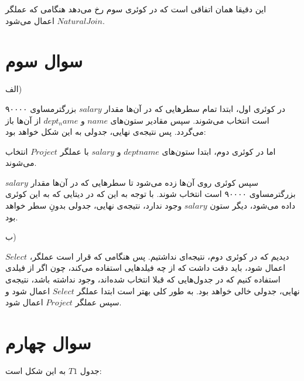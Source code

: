 این دقیقا همان اتفاقی است که در کوئری سوم رخ می‌دهد هنگامی که عملگر
$Natural Join$
اعمال می‌شود.



\section*{\centering سوال سوم}

الف)

در کوئری اول، ابتدا تمام سطرهایی که در آن‌ها مقدار 
$salary$
بزرگترمساوی ۹۰۰۰۰ است انتخاب می‌شوند. سپس مقادیر ستون‌های
$name$
و
$dept_name$
از آن‌ها باز می‌گردد.
پس نتیجه‌ی نهایی، جدولی به این شکل خواهد بود:




\begin{LTRbibitems}
\end{LTRbibitems}


اما در کوئری دوم، ابتدا ستون‌های
$deptname$
و
$salary$
با عملگر
$Project$
انتخاب می‌شوند.

سپس کوئری روی آن‌ها زده می‌شود تا سطرهایی که در آن‌ها مقدار
$salary$
بزرگترمساوی ۹۰۰۰۰ است انتخاب شوند.
با توجه به این که در دیتایی که به این کوئری داده می‌شود، دیگر ستون
$salary$
وجود ندارد، نتیجه‌ی نهایی، جدولی بدونِ سطر خواهد بود.

ب)

دیدیم که در کوئری دوم، نتیجه‌ای نداشتیم. پس هنگامی که قرار است عملگر،
$Select$
اعمال شود، باید دقت داشت که از چه فیلدهایی استفاده می‌کند، چون اگر از فیلدی استفاده کنیم که در جدول‌هایی که قبلا انتخاب شده‌اند، وجود نداشته باشد، نتیجه‌ی نهایی، جدولی خالی خواهد بود.
به طور کلی بهتر است ابتدا عملگر
$Select$
اعمال شود و سپس عملگر
$Project$
اعمال شود.



\section*{\centering سوال چهارم}
جدول
$T1$
به این شکل است:


